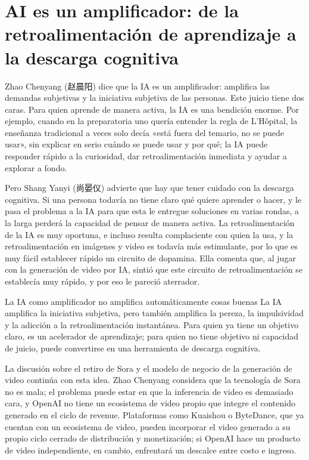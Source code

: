 \section{AI es un amplificador: de la retroalimentación de aprendizaje a la descarga cognitiva}

Zhao Chenyang (赵晨阳) dice que la IA es un amplificador: amplifica las demandas subjetivas y la iniciativa subjetiva de las personas. Este juicio tiene dos caras. Para quien aprende de manera activa, la IA es una bendición enorme. Por ejemplo, cuando en la preparatoria uno quería entender la regla de L'Hôpital, la enseñanza tradicional a veces solo decía «está fuera del temario, no se puede usar», sin explicar en serio cuándo se puede usar y por qué; la IA puede responder rápido a la curiosidad, dar retroalimentación inmediata y ayudar a explorar a fondo.

Pero Shang Yanyi (尚晏仪) advierte que hay que tener cuidado con la descarga cognitiva. Si una persona todavía no tiene claro qué quiere aprender o hacer, y le pasa el problema a la IA para que esta le entregue soluciones en varias rondas, a la larga perderá la capacidad de pensar de manera activa. La retroalimentación de la IA es muy oportuna, e incluso resulta complaciente con quien la usa, y la retroalimentación en imágenes y video es todavía más estimulante, por lo que es muy fácil establecer rápido un circuito de dopamina. Ella comenta que, al jugar con la generación de video por IA, sintió que este circuito de retroalimentación se establecía muy rápido, y por eso le pareció aterrador.

\begin{warningbox}{La IA como amplificador no amplifica automáticamente cosas buenas}
La IA amplifica la iniciativa subjetiva, pero también amplifica la pereza, la impulsividad y la adicción a la retroalimentación instantánea. Para quien ya tiene un objetivo claro, es un acelerador de aprendizaje; para quien no tiene objetivo ni capacidad de juicio, puede convertirse en una herramienta de descarga cognitiva.
\end{warningbox}

La discusión sobre el retiro de Sora y el modelo de negocio de la generación de video continúa con esta idea. Zhao Chenyang considera que la tecnología de Sora no es mala; el problema puede estar en que la inferencia de video es demasiado cara, y OpenAI no tiene un ecosistema de video propio que integre el contenido generado en el ciclo de revenue. Plataformas como Kuaishou o ByteDance, que ya cuentan con un ecosistema de video, pueden incorporar el video generado a su propio ciclo cerrado de distribución y monetización; si OpenAI hace un producto de video independiente, en cambio, enfrentará un descalce entre costo e ingreso.

